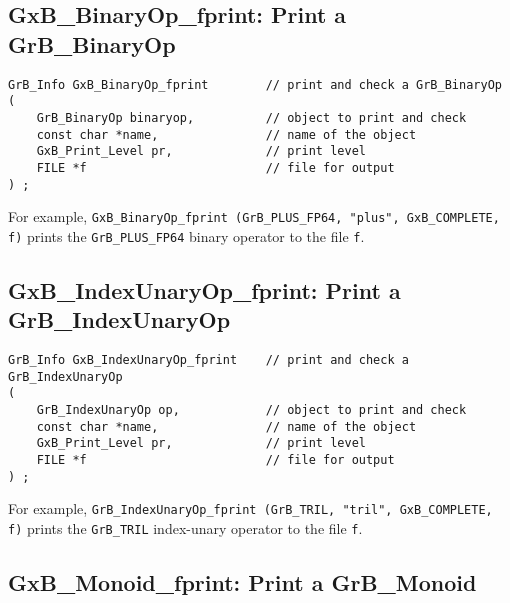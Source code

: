 \documentclass[12pt]{article}
\begin{document}
{%
\subsection{{\sf GxB\_BinaryOp\_fprint:} Print a {\sf GrB\_BinaryOp}}

\begin{mdframed}[userdefinedwidth=6in]
{\footnotesize
\begin{verbatim}
GrB_Info GxB_BinaryOp_fprint        // print and check a GrB_BinaryOp
(
    GrB_BinaryOp binaryop,          // object to print and check
    const char *name,               // name of the object
    GxB_Print_Level pr,             // print level
    FILE *f                         // file for output
) ;
\end{verbatim} } \end{mdframed}

For example,
\verb'GxB_BinaryOp_fprint (GrB_PLUS_FP64, "plus", GxB_COMPLETE, f)' prints the
\verb'GrB_PLUS_FP64' binary operator to the file \verb'f'.


\subsection{{\sf GxB\_IndexUnaryOp\_fprint:} Print a {\sf GrB\_IndexUnaryOp}}

\begin{mdframed}[userdefinedwidth=6in]
{\footnotesize
\begin{verbatim}
GrB_Info GxB_IndexUnaryOp_fprint    // print and check a GrB_IndexUnaryOp
(
    GrB_IndexUnaryOp op,            // object to print and check
    const char *name,               // name of the object
    GxB_Print_Level pr,             // print level
    FILE *f                         // file for output
) ;
\end{verbatim} } \end{mdframed}

For example,
\verb'GrB_IndexUnaryOp_fprint (GrB_TRIL, "tril", GxB_COMPLETE, f)' prints
the \verb'GrB_TRIL' index-unary operator to the file \verb'f'.

\newpage
\subsection{{\sf GxB\_Monoid\_fprint:} Print a {\sf GrB\_Monoid}}

}
\end{document}
